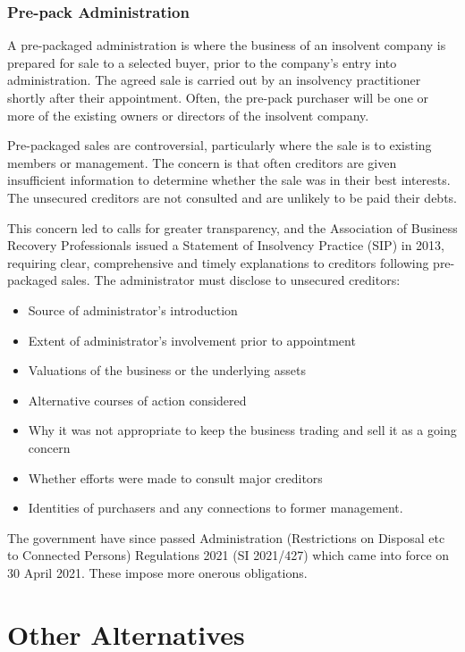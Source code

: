 \documentclass[
]{article}
\providecommand{\tightlist}{%
  \setlength{\itemsep}{0pt}\setlength{\parskip}{0pt}}
\begin{document}
\hypertarget{pre-pack-administration}{%
\subsubsection{Pre-pack Administration}\label{pre-pack-administration}}

A pre-packaged administration is where the business of an insolvent
company is prepared for sale to a selected buyer, prior to the company's
entry into administration. The agreed sale is carried out by an
insolvency practitioner shortly after their appointment. Often, the
pre-pack purchaser will be one or more of the existing owners or
directors of the insolvent company.

Pre-packaged sales are controversial, particularly where the sale is to
existing members or management. The concern is that often creditors are
given insufficient information to determine whether the sale was in
their best interests. The unsecured creditors are not consulted and are
unlikely to be paid their debts.

This concern led to calls for greater transparency, and the Association
of Business Recovery Professionals issued a Statement of Insolvency
Practice (SIP) in 2013, requiring clear, comprehensive and timely
explanations to creditors following pre-packaged sales. The
administrator must disclose to unsecured creditors:

\begin{itemize}
\tightlist
\item
  Source of administrator's introduction
\item
  Extent of administrator's involvement prior to appointment
\item
  Valuations of the business or the underlying assets
\item
  Alternative courses of action considered
\item
  Why it was not appropriate to keep the business trading and sell it as
  a going concern
\item
  Whether efforts were made to consult major creditors
\item
  Identities of purchasers and any connections to former management.
\end{itemize}

The government have since passed Administration (Restrictions on
Disposal etc to Connected Persons) Regulations 2021 (SI 2021/427) which
came into force on 30 April 2021. These impose more onerous obligations.

\hypertarget{other-alternatives}{%
\section{Other Alternatives}\label{other-alternatives}}
\end{document}
